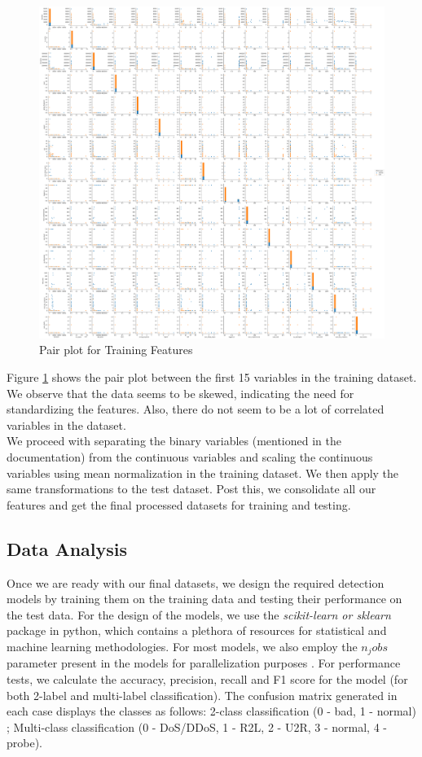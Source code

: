 \begin{figure}
	\includegraphics[width=1.0\columnwidth]{images/pairplot.png}
	\caption{Pair plot for Training Features}
	\label{F:pair}
\end{figure}
Figure \ref{F:pair} shows the pair plot between the first 15 variables in the training dataset. We observe that the data seems to be skewed, indicating the need for standardizing the features. Also, there do not seem to be a lot of correlated variables in the dataset.\\
We proceed with separating the binary variables (mentioned in the documentation) from the continuous variables and scaling the continuous variables using mean normalization in the training dataset. We then apply the same transformations to the test dataset. Post this, we consolidate all our features and get the final processed datasets for training and testing.

\subsection{Data Analysis}
Once we are ready with our final datasets, we design the required detection models by training them on the training data and testing their performance on the test data. For the design of the models, we use the {\em scikit-learn or sklearn} package in python, which contains a plethora of resources for statistical and machine learning methodologies. For most models, we also employ the {\em $n_jobs$} parameter present in the models for parallelization purposes \cite{scikit12}. For performance tests, we calculate the accuracy, precision, recall and F1 score for the model (for both 2-label and multi-label classification). The confusion matrix generated in each case displays the classes as follows: 2-class classification (0 - bad, 1 - normal) ; Multi-class classification (0 - DoS/DDoS, 1 - R2L, 2 - U2R, 3 - normal, 4 - probe).

